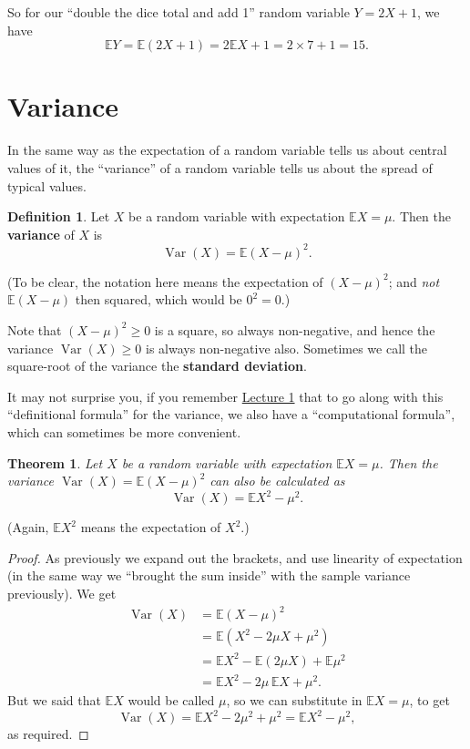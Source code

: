 \documentclass[
  a4paper,
]{book}
\newtheorem{theorem}{Theorem}[chapter]
\theoremstyle{definition}
\newtheorem{definition}{Definition}[chapter]
\theoremstyle{definition}
\theoremstyle{definition}
\theoremstyle{definition}
\theoremstyle{remark}
\begin{document}
So for our ``double the dice total and add 1'' random variable \(Y = 2X + 1\), we have
\[ \mathbb EY = \mathbb E(2X+1) = 2\mathbb EX + 1 = 2\times 7 + 1 = 15. \]

\hypertarget{variance}{%
\section{Variance}\label{variance}}

In the same way as the expectation of a random variable tells us about central values of it, the ``variance'' of a random variable tells us about the spread of typical values.

\begin{definition}
Let \(X\) be a random variable with expectation \(\mathbb EX = \mu\). Then the \textbf{variance} of \(X\) is
\[ \operatorname{Var}(X) = \mathbb E(X - \mu)^2 . \]
\end{definition}

(To be clear, the notation here means the expectation of \((X-\mu)^2\); and \emph{not} \(\mathbb E(X - \mu)\) then squared, which would be \(0^2 = 0\).)

Note that \((X - \mu)^2 \geq 0\) is a square, so always non-negative, and hence the variance \(\operatorname{Var}(X) \geq 0\) is always non-negative also. Sometimes we call the square-root of the variance the \textbf{standard deviation}.

It may not surprise you, if you remember \protect\hyperlink{L01-stats}{Lecture 1} that to go along with this ``definitional formula'' for the variance, we also have a ``computational formula'', which can sometimes be more convenient.

\begin{theorem}
Let \(X\) be a random variable with expectation \(\mathbb EX = \mu\). Then the variance \(\operatorname{Var}(X) = \mathbb E(X - \mu)^2\) can also be calculated as
\[ \operatorname{Var}(X) = \mathbb EX^2 - \mu^2 . \]
\end{theorem}

(Again, \(\mathbb EX^2\) means the expectation of \(X^2\).)

\begin{proof}
As previously we expand out the brackets, and use linearity of expectation (in the same way we ``brought the sum inside'' with the sample variance previously). We get
\begin{align*}
  \operatorname{Var}(X) &= \mathbb E(X - \mu)^2 \\
    &= \mathbb E(X^2 - 2\mu X + \mu^2) \\
    &= \mathbb EX^2 - \mathbb E(2\mu X) + \mathbb E \mu^2 \\
    &= \mathbb EX^2 - 2\mu \,\mathbb EX + \mu^2 .
\end{align*}
But we said that \(\mathbb EX\) would be called \(\mu\), so we can substitute in \(\mathbb EX = \mu\), to get
\[ \operatorname{Var}(X) = \mathbb E X^2 - 2\mu^2 + \mu^2 = \mathbb E X^2 - \mu^2 , \]
as required.
\end{proof}
\end{document}
